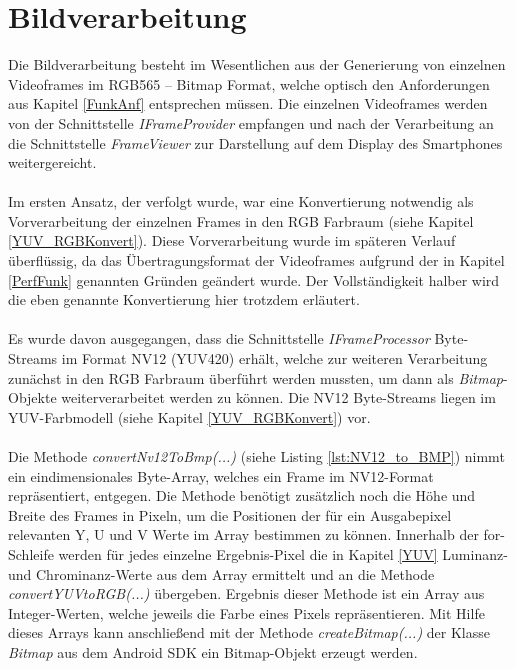\chapter{Bildverarbeitung} \label{chap:Bildverarbeitung}

Die Bildverarbeitung besteht im Wesentlichen aus der Generierung von einzelnen Videoframes im RGB565 – Bitmap Format, welche optisch den Anforderungen aus Kapitel \ref{FunkAnf} entsprechen müssen. Die einzelnen Videoframes werden von der Schnittstelle \textit{IFrameProvider} empfangen und nach der Verarbeitung an die Schnittstelle \textit{FrameViewer} zur Darstellung auf dem Display des Smartphones weitergereicht.
\\
\\
Im ersten Ansatz, der verfolgt wurde, war eine Konvertierung notwendig als Vorverarbeitung der einzelnen Frames in den RGB Farbraum (siehe Kapitel \ref{YUV_RGBKonvert}). Diese Vorverarbeitung wurde im späteren Verlauf überflüssig, da das Übertragungsformat der Videoframes aufgrund der in Kapitel \ref{PerfFunk} genannten Gründen geändert wurde. Der Vollständigkeit halber wird die eben genannte Konvertierung hier trotzdem erläutert.
\\
\\
Es wurde davon ausgegangen, dass die Schnittstelle \textit{IFrameProcessor} Byte-Streams im Format NV12 (YUV420) erhält, welche zur weiteren Verarbeitung zunächst in den RGB Farbraum überführt werden mussten, um dann als \textit{Bitmap}-Objekte weiterverarbeitet werden zu können. Die NV12 Byte-Streams liegen im YUV-Farbmodell (siehe Kapitel \ref{YUV_RGBKonvert}) vor. 
\\
\\
Die Methode \textit{convertNv12ToBmp(...)} (siehe Listing \ref{lst:NV12_to_BMP}) nimmt ein eindimensionales Byte-Array, welches ein Frame im NV12-Format repräsentiert, entgegen. Die Methode benötigt zusätzlich noch die Höhe und Breite des Frames in Pixeln, um die Positionen der für ein Ausgabepixel relevanten Y, U und V Werte im Array bestimmen zu können. Innerhalb der for-Schleife werden für jedes einzelne Ergebnis-Pixel die in Kapitel \ref{YUV} Luminanz- und Chrominanz-Werte aus dem Array ermittelt und an die Methode \textit{convertYUVtoRGB(...)} übergeben. Ergebnis dieser Methode ist ein Array aus Integer-Werten, welche jeweils die Farbe eines Pixels repräsentieren. Mit Hilfe dieses Arrays kann anschließend mit der Methode \textit{createBitmap(...)} der Klasse \textit{Bitmap} aus dem Android SDK ein Bitmap-Objekt erzeugt werden. 
\clearpage

